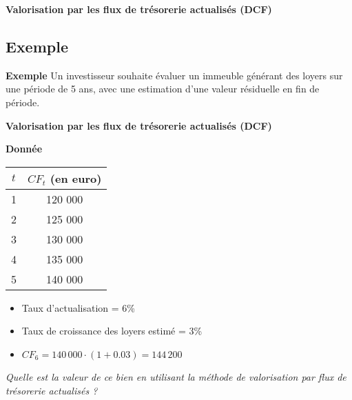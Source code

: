 \documentclass{beamer}
\begin{document}
\begin{frame}{\textbf{Valorisation par les flux de trésorerie actualisés (DCF)}}
\subsection{Exemple}
\begin{exampleblock}{\textbf{Exemple}}
Un investisseur souhaite évaluer un immeuble générant des loyers sur une période de 5 ans, avec une estimation d’une valeur résiduelle en fin de période.
\end{exampleblock}	

\end{frame}

\begin{frame}{\textbf{Valorisation par les flux de trésorerie actualisés (DCF)}}
	\begin{exampleblock}{\textbf{Donnée}}
		\begin{center}
			\begin{tabular}{@{}cc@{}}
				\toprule
				\( t \) & \( CF_t\) (en euro)\\ \midrule
				1   & 120 000                   \\
				2   & 125 000                   \\
				3   & 130 000                   \\
				4   & 135 000                   \\
				5   & 140 000                   \\ \bottomrule
			\end{tabular}
		\end{center}
		
\begin{itemize}
	\item Taux d'actualisation = 6\%
	\item Taux de croissance des loyers estimé = 3\%
	\item \( CF_6 = 140\,000 \cdot (1+0.03)=144\,200 \)
\end{itemize}
		
\textit{Quelle est la valeur de ce bien en utilisant la méthode de valorisation par flux de trésorerie actualisés ?}
\end{exampleblock}
\end{frame}
\end{document}
